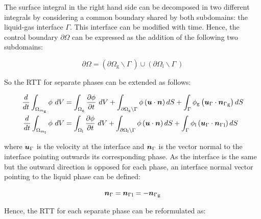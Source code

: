 The surface integral in the right hand side can be decomposed in two different integrals by considering a common boundary shared by both subdomains: the liquid-gas interface $\Gamma$. This interface can be modified with time. Hence, the control boundary $\partial \Omega$ can be expressed as the addition of the following two subdomains:

\begin{equation}
\label{eq:partial_omega_boundaries_partition}
\partial \Omega = \left( \partial \Omega_\mathrm{g} \backslash \Gamma ~ \right) \cup \left( \partial \Omega_\mathrm{l} \backslash \Gamma ~ \right)
\end{equation}

So the RTT for separate phases can be extended as follows:


\begin{subequations}
\begin{align}
\frac{d}{dt} \int_{\Omega_{m_\mathrm{g}}} \phi ~ dV &=  \int_{\Omega_\mathrm{g}} \frac{\partial \phi}{\partial t} ~ dV + \int_{\partial \Omega_\mathrm{g} \backslash \Gamma} \phi \left( \boldsymbol{u} \cdot \boldsymbol{n} \right) dS + \int_{\Gamma} \phi_\mathrm{g} \left( \boldsymbol{u}_{\scriptsize{\Gamma}} \cdot {\boldsymbol{n}_{\scriptsize{\Gamma}}}_\mathrm{g} \right) dS \\
\frac{d}{dt} \int_{\Omega_{m_\mathrm{l}}} \phi ~ dV &=  \int_{\Omega_\mathrm{l}} \frac{\partial \phi}{\partial t} ~ dV + \int_{\partial \Omega_\mathrm{l} \backslash \Gamma} \phi \left( \boldsymbol{u} \cdot \boldsymbol{n} \right) dS + \int_{\Gamma} \phi_\mathrm{l} \left( \boldsymbol{u}_{\scriptsize{\Gamma}} \cdot {\boldsymbol{n}_{\scriptsize{\Gamma}}}_\mathrm{l} \right) dS
\end{align}
\end{subequations}

where $\boldsymbol{u}_{\scriptsize{\Gamma}}$ is the velocity at the interface and $\boldsymbol{n}_{\scriptsize{\Gamma}}$ is the vector normal to the interface pointing outwards its corresponding phase. As the interface is the same but the outward direction is opposed for each phase, an interface normal vector pointing to the liquid phase can be defined: 

\begin{equation}
\boldsymbol{n}_{\scriptsize{\Gamma}} = {\boldsymbol{n}_{\scriptsize{\Gamma}}}_\mathrm{l} = - {\boldsymbol{n}_{\scriptsize{\Gamma}}}_\mathrm{g}
\end{equation}

Hence, the RTT for each separate phase can be reformulated as:

